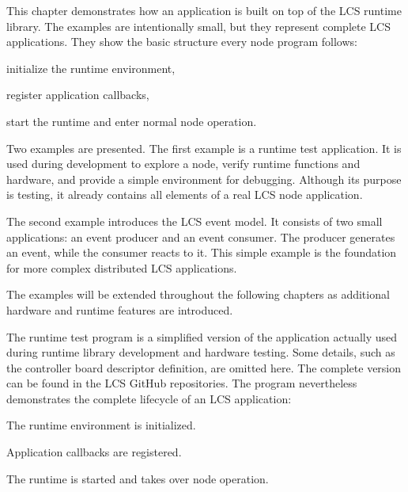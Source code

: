 
This chapter demonstrates how an application is built on top of the LCS runtime
library. The examples are intentionally small, but they represent complete LCS
applications. They show the basic structure every node program follows:

\begin{smallGapItemize}
\item initialize the runtime environment,
\item register application callbacks,
\item start the runtime and enter normal node operation.
\end{smallGapItemize}

Two examples are presented.
The first example is a runtime test application. It is used during development
to explore a node, verify runtime functions and hardware, and provide a simple
environment for debugging. Although its purpose is testing, it already contains
all elements of a real LCS node application.

The second example introduces the LCS event model. It consists of two small
applications: an event producer and an event consumer. The producer generates
an event, while the consumer reacts to it. This simple example is the foundation
for more complex distributed LCS applications.

The examples will be extended throughout the following chapters as additional
hardware and runtime features are introduced.


The runtime test program is a simplified version of the application actually
used during runtime library development and hardware testing. Some details, such
as the controller board descriptor definition, are omitted here. The complete
version can be found in the LCS GitHub repositories. 
The program nevertheless demonstrates the complete lifecycle of an LCS application:

\begin{smallGapItemize}
\item The runtime environment is initialized.
\item Application callbacks are registered.
\item The runtime is started and takes over node operation.
\end{smallGapItemize}

